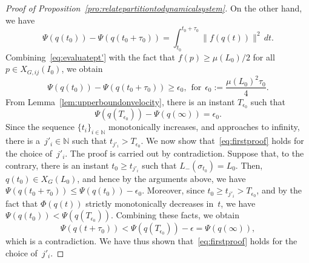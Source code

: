 \documentclass[10pt,twocolumn,twoside]{IEEEtran}
\renewcommand{\(}{\left (}
\renewcommand{\)}{\right )}
\renewcommand{\;}{\,;\,}
\newcommand{\N}{\mathbb{N}}
\begin{document}
\begin{proof}[Proof of Proposition~\ref{pro:relatepartitiontodynamicalsystem}]
On the other hand, we have
$$
\Psi(q(t_0)) - \Psi(q(t_0 + \tau_0))   =  \int^{t_0+ \tau_0}_{t_0}\| f(q(t)) \|^2 \, dt. 
$$
Combining~\eqref{eq:evaluatept'} with the fact that $f(p) \ge \mu(L_0) /2 $ for all $p\in X_{G,ij}(I_0)$, we obtain 
\begin{equation*}\label{eq:epsilon0decrease}
\Psi(q(t_0)) - \Psi(q(t_0 + \tau_0))   \ge \epsilon_0, \hspace{5pt}\mbox{for} \hspace{5pt} \epsilon_0 :=  \frac{\mu(L_0)^2\tau_0}{4}.
\end{equation*}
From Lemma~\ref{lem:upperboundonvelocity}, there is an instant $T_{\epsilon_0}$ such that 
\begin{equation*}\label{eq:deltaisepsilon0}
\Psi(q(T_{\epsilon_0})) - \Psi(q(\infty)) = \epsilon_0. 
\end{equation*}
Since the sequence $\{t_i\}_{i\in \N}$  monotonically increases, and approaches to infinity, there is a~$j'_i\in \N$ such that 
$
t_{j'_i} > T_{\epsilon_0}  
$. 
We now show that~\eqref{eq:firstproof} holds for the choice of~$j'_i$. The proof is carried out by contradiction. Suppose that, to the contrary, there is an instant $t_0 \ge t_{j'_i}$ such that
$
L_{-}(\sigma_{t_0}) = L_0
$. Then, $q(t_0) \in X_{G}(L_0)$, and hence by the arguments above, we have $\Psi(q(t_0 + \tau_0))\le \Psi(q(t_0)) - \epsilon_0$. Moreover, since $t_0 \ge t_{j'_i} > T_{\epsilon_0}$, and by the fact that $\Phi(q(t))$ strictly monotonically decreases in~$t$, we have
$ \Psi(q(t_0)) < \Psi(q(T_{\epsilon_0}))$. Combining these facts, we obtain 
$$
\Psi(q(t + \tau_0)) < \Psi(q(T_{\epsilon_0})) - \epsilon = \Psi(q(\infty)),
$$
which is a contradiction. We have thus shown that~\eqref{eq:firstproof} holds for the choice of~$j'_i$. 



\end{proof}
\end{document}

